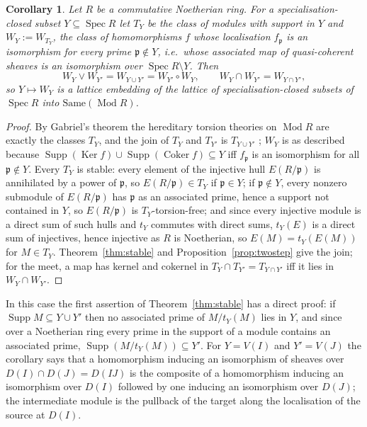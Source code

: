 \documentclass[11pt]{amsart}
\newtheorem{cor}[thm]{Corollary}
\theoremstyle{definition}
\newcommand{\Same}{\mathrm{Same}}
\begin{document}
\begin{cor}\label{cor:noeth}
Let $R$ be a commutative Noetherian ring. For a specialisation-closed subset
$Y\subseteq\operatorname{Spec}R$ let $T_Y$ be the class of modules with
support in $Y$ and $W_Y:=W_{T_Y}$, the class of homomorphisms $f$ whose
localisation $f_{\mathfrak p}$ is an isomorphism for every prime
$\mathfrak p\notin Y$, i.e.\ whose associated map of quasi-coherent sheaves
is an isomorphism over $\operatorname{Spec}R\setminus Y$. Then
\[
W_Y\vee W_{Y'}=W_{Y\cup Y'}=W_{Y'}\circ W_Y,\qquad
W_Y\cap W_{Y'}=W_{Y\cap Y'},
\]
so $Y\mapsto W_Y$ is a lattice embedding of the lattice of
specialisation-closed subsets of $\operatorname{Spec}R$ into
$\Same(\operatorname{Mod}R)$.
\end{cor}
\begin{proof}
By Gabriel's theorem the hereditary torsion theories on
$\operatorname{Mod}R$ are exactly the classes $T_Y$, and the join of $T_Y$
and $T_{Y'}$ is $T_{Y\cup Y'}$ \cite[Ch.~VII]{Stenstrom}; $W_Y$ is as
described because $\operatorname{Supp}(\operatorname{Ker}f)\cup
\operatorname{Supp}(\operatorname{Coker}f)\subseteq Y$ iff $f_{\mathfrak p}$
is an isomorphism for all $\mathfrak p\notin Y$. Every $T_Y$ is stable: every
element of the injective hull $E(R/\mathfrak p)$ is annihilated by a power of
$\mathfrak p$, so $E(R/\mathfrak p)\in T_Y$ if $\mathfrak p\in Y$; if
$\mathfrak p\notin Y$, every nonzero submodule of $E(R/\mathfrak p)$ has
$\mathfrak p$ as an associated prime, hence a support not contained in $Y$,
so $E(R/\mathfrak p)$ is $T_Y$-torsion-free; and since every injective
module is a direct sum of such hulls and $t_Y$ commutes with direct sums,
$t_Y(E)$ is a direct sum of injectives, hence injective as $R$ is
Noetherian, so $E(M)=t_Y(E(M))$ for $M\in T_Y$. Theorem~\ref{thm:stable} and
Proposition~\ref{prop:twostep} give the join; for the meet, a map has kernel and cokernel in
$T_Y\cap T_{Y'}=T_{Y\cap Y'}$ iff it lies in $W_Y\cap W_{Y'}$.
\end{proof}

In this case the first assertion of Theorem~\ref{thm:stable} has a direct
proof: if $\operatorname{Supp}M\subseteq Y\cup Y'$ then no associated prime
of $M/t_Y(M)$ lies in $Y$, and since over a Noetherian ring every prime in
the support of a module contains an associated prime,
$\operatorname{Supp}(M/t_Y(M))\subseteq Y'$. For $Y=V(I)$ and $Y'=V(J)$ the
corollary says that a homomorphism inducing an isomorphism of sheaves over
$D(I)\cap D(J)=D(IJ)$ is the composite of a homomorphism inducing an
isomorphism over $D(I)$ followed by one inducing an isomorphism over
$D(J)$; the intermediate module is the pullback of the target along the
localisation of the source at $D(I)$.
\end{document}
